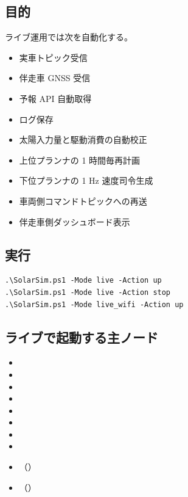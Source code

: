\documentclass[a4paper,11pt]{article}
\begin{document}
\subsection{目的}

ライブ運用では次を自動化する。

\begin{itemize}
  \item 実車トピック受信
  \item 伴走車 GNSS 受信
  \item 予報 API 自動取得
  \item ログ保存
  \item 太陽入力量と駆動消費の自動校正
  \item 上位プランナの 1 時間毎再計画
  \item 下位プランナの 1 Hz 速度司令生成
  \item 車両側コマンドトピックへの再送
  \item 伴走車側ダッシュボード表示
\end{itemize}

\subsection{実行}

\begin{Verbatim}[fontsize=\small]
.\SolarSim.ps1 -Mode live -Action up
.\SolarSim.ps1 -Mode live -Action stop
.\SolarSim.ps1 -Mode live_wifi -Action up
\end{Verbatim}

\subsection{ライブで起動する主ノード}

\begin{itemize}
  \item {}
  \item {}
  \item {}
  \item {}
  \item {}
  \item {}
  \item {}
  \item {}
  \item {} （）
  \item {} （）
\end{itemize}
\end{document}
